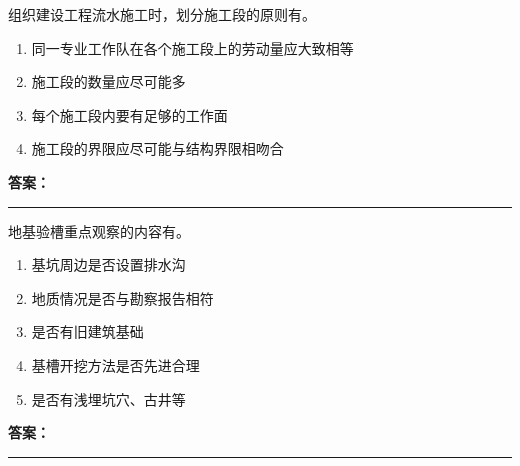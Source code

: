 \documentclass[UTF8,fontset=fandol,11pt]{ctexart}
\newcommand{\answerline}{\textcolor{answerred}{\rule{2.4cm}{0.7pt}}}
\begin{document}
\begin{quizbox}[title={乱序第 223 题｜第十章流水施工原理}]

组织建设工程流水施工时，划分施工段的原则有。\\

\begin{enumerate}[label=\Alph*.]

\item 同一专业工作队在各个施工段上的劳动量应大致相等

\item 施工段的数量应尽可能多

\item 每个施工段内要有足够的工作面

\item 施工段的界限应尽可能与结构界限相吻合

\end{enumerate}

\textbf{\textcolor{answerred}{答案：}} \answerline

\end{quizbox}

\vspace{0.2em}

\begin{quizbox}[title={乱序第 224 题｜第一章土方工程}]

地基验槽重点观察的内容有。\\

\begin{enumerate}[label=\Alph*.]

\item 基坑周边是否设置排水沟

\item 地质情况是否与勘察报告相符

\item 是否有旧建筑基础

\item 基槽开挖方法是否先进合理

\item 是否有浅埋坑穴、古井等

\end{enumerate}

\textbf{\textcolor{answerred}{答案：}} \answerline

\end{quizbox}

\vspace{0.2em}
\end{document}
